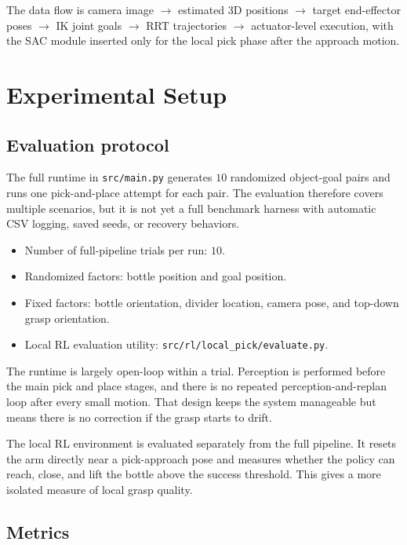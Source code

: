 \documentclass[11pt]{article}
\begin{document}
The data flow is camera image \(\rightarrow\) estimated 3D positions \(\rightarrow\) target end-effector poses \(\rightarrow\) IK joint goals \(\rightarrow\) RRT trajectories \(\rightarrow\) actuator-level execution, with the SAC module inserted only for the local pick phase after the approach motion.

\section{Experimental Setup}

\subsection{Evaluation protocol}

The full runtime in \texttt{src/main.py} generates \(10\) randomized object-goal pairs and runs one pick-and-place attempt for each pair. The evaluation therefore covers multiple scenarios, but it is not yet a full benchmark harness with automatic CSV logging, saved seeds, or recovery behaviors.

\begin{itemize}[leftmargin=*]
    \item Number of full-pipeline trials per run: \(10\).
    \item Randomized factors: bottle position and goal position.
    \item Fixed factors: bottle orientation, divider location, camera pose, and top-down grasp orientation.
    \item Local RL evaluation utility: \texttt{src/rl/local\_pick/evaluate.py}.
\end{itemize}

The runtime is largely open-loop within a trial. Perception is performed before the main pick and place stages, and there is no repeated perception-and-replan loop after every small motion. That design keeps the system manageable but means there is no correction if the grasp starts to drift.

The local RL environment is evaluated separately from the full pipeline. It resets the arm directly near a pick-approach pose and measures whether the policy can reach, close, and lift the bottle above the success threshold. This gives a more isolated measure of local grasp quality.

\subsection{Metrics}
\end{document}
